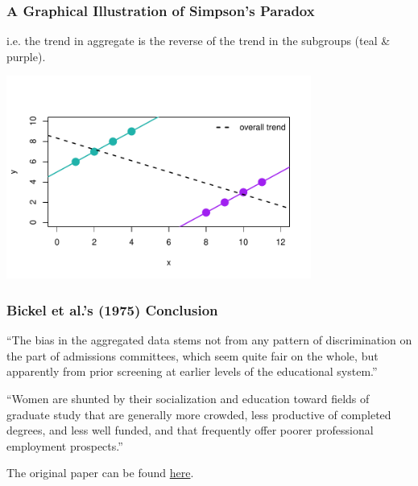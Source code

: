 \documentclass[handout]{beamer}
\newcommand{\blue}[1]{\textcolor{blue2}{#1}}
\begin{document}
\begin{frame}
\frametitle{A Graphical Illustration of Simpson's Paradox}
i.e. the trend in aggregate is the \blue{reverse} of the trend in the subgroups (teal \& purple).
\begin{center}
\includegraphics[width=10cm]{figure/simpsons5.pdf}
\end{center}

\end{frame}



\begin{frame}
\frametitle{Bickel et al.'s (1975) Conclusion}

``The bias in the aggregated data stems not from any pattern of discrimination on the part of admissions committees, which seem quite fair on the whole, \pause but apparently from prior screening at earlier levels of the educational system.''

\vspace{0.25in}

\pause ``Women are shunted by their socialization and education toward fields of graduate study that are generally more crowded, less productive of completed degrees, and less well funded, and that frequently offer poorer professional employment prospects.''

\vspace{0.25in}

The original paper can be found \blue{\href{http://www.unc.edu/~nielsen/soci708/cdocs/Berkeley\_admissions\_bias.pdf}{here}}.

\end{frame}
\end{document}
